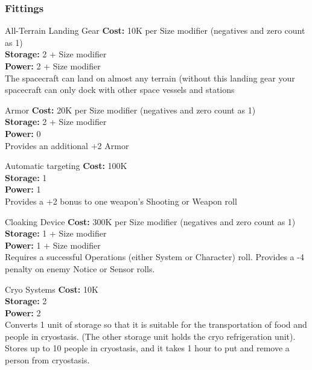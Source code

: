 \begin{multicols}{2}

\subsubsection{Fittings}

\begin{genericsection}{All-Terrain Landing Gear}
\textbf{Cost:} 10K per Size modifier (negatives and zero count as 1)\\
\textbf{Storage:} 2 + Size modifier\\
\textbf{Power:} 2 + Size modifier\\
The spacecraft can land on almost any terrain (without this landing gear your spacecraft can only dock with other space vessels and stations
\end{genericsection}

\begin{genericsection}{Armor}
\textbf{Cost:} 20K per Size modifier (negatives and zero count as 1)\\
\textbf{Storage:} 2 + Size modifier\\
\textbf{Power:} 0\\
Provides an additional +2 Armor
\end{genericsection}

\begin{genericsection}{Automatic targeting}
\textbf{Cost:} 100K\\
\textbf{Storage:} 1\\
\textbf{Power:} 1\\
Provides a +2 bonus to one weapon's Shooting or Weapon roll
\end{genericsection}

\begin{genericsection}{Cloaking Device}
\textbf{Cost:} 300K per Size modifier (negatives and zero count as 1)\\
\textbf{Storage:} 1 + Size modifier\\
\textbf{Power:} 1 + Size modifier\\
Requires a successful Operations (either System or Character) roll. Provides a -4 penalty on enemy Notice or Sensor rolls.
\end{genericsection}

\begin{genericsection}{Cryo Systems}
\textbf{Cost:} 10K\\
\textbf{Storage:} 2\\
\textbf{Power:} 2\\
Converts 1 unit of storage so that it is suitable for the transportation of food and people in cryostasis. (The other storage unit holds the cryo refrigeration unit). Stores up to 10 people in cryostasis, and it takes 1 hour to put and remove a person from cryostasis.
\end{genericsection}


\end{multicols}
